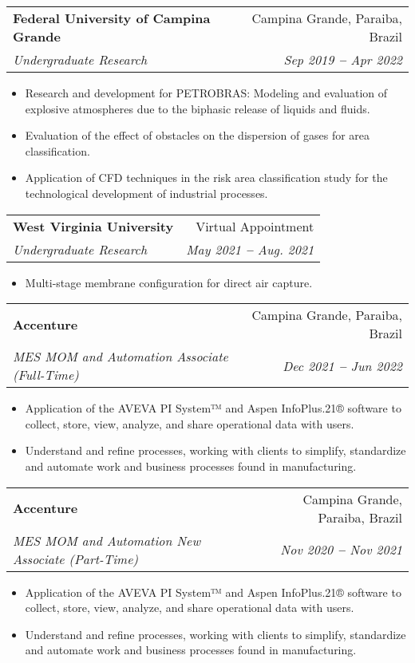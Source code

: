 \documentclass[letterpaper,11pt]{article}
\makeatletter
\newcommand{\resumeItem}[1]{
  \item\small{
    {#1 \vspace{-2pt}}
  }
}
\newcommand{\resumeSubheading}[4]{
  \vspace{-2pt}\item
    \begin{tabular*}{0.97\textwidth}[t]{l@{\extracolsep{\fill}}r}
      \textbf{#1} & #2 \\
      \textit{\small#3} & \textit{\small #4} \\
    \end{tabular*}\vspace{-7pt}
}
\newcommand{\resumeItemListStart}{\begin{itemize}}
\newcommand{\resumeItemListEnd}{\end{itemize}\vspace{-5pt}}
\makeatother
\begin{document}

    \resumeSubheading
      {Federal University of Campina Grande}{Campina Grande, Paraiba, Brazil}
      {Undergraduate Research}{Sep 2019 \textbf{--} Apr 2022}
        \resumeItemListStart
            \resumeItem{Research and development for PETROBRAS:
            Modeling and evaluation of explosive atmospheres
             due to the biphasic release of liquids and fluids.}
            \resumeItem{Evaluation of the effect of obstacles on the dispersion of gases for area classification.}
            \resumeItem{Application of CFD techniques in the 
            risk area classification study for the 
            technological development of industrial processes.}
        \resumeItemListEnd
    
   \resumeSubheading
      {West Virginia University}{Virtual Appointment}
      {Undergraduate Research}{May 2021 \textbf{--} Aug. 2021}
        \resumeItemListStart
            \resumeItem{Multi-stage membrane configuration for direct air capture.}
        \resumeItemListEnd    

    \resumeSubheading
      {Accenture}{Campina Grande, Paraiba, Brazil}
      {MES MOM and Automation Associate (Full-Time)}{Dec 2021 \textbf{--} Jun 2022}
        \resumeItemListStart
            \resumeItem{Application of the AVEVA PI System™ and Aspen InfoPlus.21® software to collect, store, view, analyze, and share operational data with users.}
            \resumeItem{Understand and refine processes, working with clients to simplify, standardize and automate work and business processes found in manufacturing.}
          \resumeItemListEnd


    \resumeSubheading
    {Accenture}{Campina Grande, Paraiba, Brazil}
    {MES MOM and Automation New Associate (Part-Time)}{Nov 2020 \textbf{--} Nov 2021}
      \resumeItemListStart
          \resumeItem{Application of the AVEVA PI System™ and Aspen InfoPlus.21® software to collect, store, view, analyze, and share operational data with users.}
          \resumeItem{Understand and refine processes, working with clients to simplify, standardize and automate work and business processes found in manufacturing.}
        \resumeItemListEnd
\end{document}
